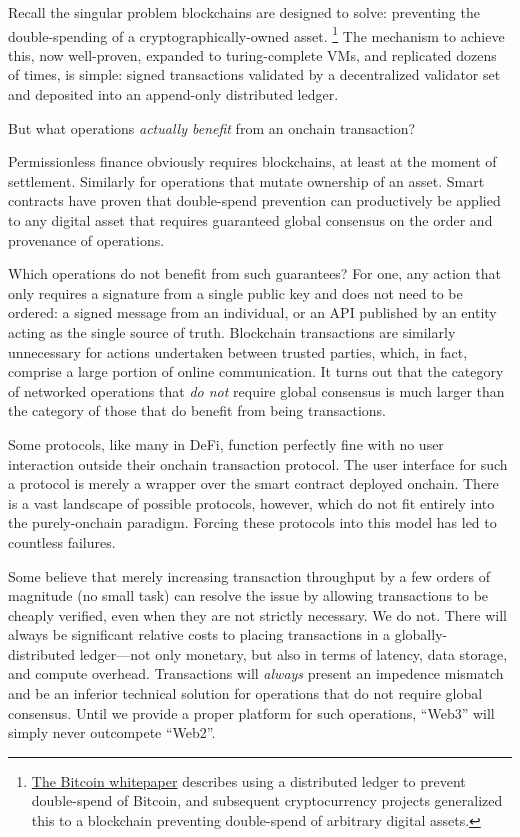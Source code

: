 \documentclass[runningheads]{llncs}
\begin{document}
Recall the singular problem blockchains are designed to solve: preventing the double-spending of a cryptographically-owned asset.
\footnote{\href{https://bitcoin.org/bitcoin.pdf}{The Bitcoin whitepaper} describes using a distributed ledger to prevent double-spend of Bitcoin, and subsequent cryptocurrency projects generalized this to a blockchain preventing double-spend of arbitrary digital assets.}
The mechanism to achieve this, now well-proven, expanded to turing-complete VMs, and replicated dozens of times, is simple: signed transactions validated by a decentralized validator set and deposited into an append-only distributed ledger.

But what operations \textit{actually benefit} from an onchain transaction?

Permissionless finance obviously requires blockchains, at least at the moment of settlement.
Similarly for operations that mutate ownership of an asset.
Smart contracts have proven that double-spend prevention can productively be applied to any digital asset that requires guaranteed global consensus on the order and provenance of operations.

Which operations do not benefit from such guarantees?
For one, any action that only requires a signature from a single public key and does not need to be ordered:
a signed message from an individual, or an API published by an entity acting as the single source of truth.
Blockchain transactions are similarly unnecessary for actions undertaken between trusted parties, which, in fact, comprise a large portion of online communication.
It turns out that the category of networked operations that \textit{do not} require global consensus is much larger than the category of those that do benefit from being transactions.

Some protocols, like many in DeFi, function perfectly fine with no user interaction outside their onchain transaction protocol.
The user interface for such a protocol is merely a wrapper over the smart contract deployed onchain.
There is a vast landscape of possible protocols, however, which do not fit entirely into the purely-onchain paradigm.
Forcing these protocols into this model has led to countless failures.

Some believe that merely increasing transaction throughput by a few orders of magnitude (no small task) can resolve the issue by allowing transactions to be cheaply verified, even when they are not strictly necessary.
We do not.
There will always be significant relative costs to placing transactions in a globally-distributed ledger—not only monetary, but also in terms of latency, data storage, and compute overhead.
Transactions will \textit{always} present an impedence mismatch and be an inferior technical solution for operations that do not require global consensus.
Until we provide a proper platform for such operations, ``Web3'' will simply never outcompete ``Web2''.
\end{document}
